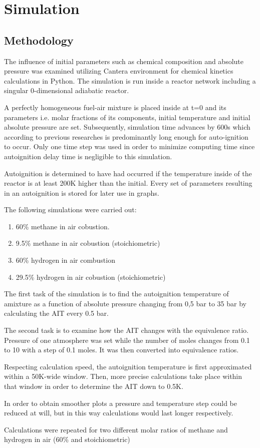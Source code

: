 \documentclass[a4paper,11pt]{article}
\begin{document}
       
    \section{Simulation}
    
    \subsection{Methodology}
    	The influence of initial parameters such as chemical composition and absolute pressure was examined utilizing Cantera environment for chemical kinetics calculations in Python. The simulation is run inside a reactor network including a singular 0-dimensional adiabatic reactor. \par 
        A perfectly homogeneous fuel-air mixture is placed inside at t=0 and its parameters i.e. molar fractions of its components, initial temperature and initial absolute pressure are set. Subsequently, simulation time advances by 600s which according to previous researches is predominantly long enough for auto-ignition to occur. Only one time step was used in order to minimize computing time since autoignition delay time is negligible to this simulation. \par 
        Autoignition is determined to have had occurred if the temperature inside of the reactor is at least 200K higher than the initial. Every set of parameters resulting in an autoignition is stored for later use in graphs. \par
        \newpage
        The following simulations were carried out:
\begin{enumerate}
  \item 60\% methane in air cobustion.
  \item 9.5\% methane in air cobustion (stoichiometric)
  \item 60\% hydrogen in air combustion
  \item 29.5\% hydrogen in air cobustion (stoichiometric)
\end{enumerate}
        The first task of the simulation is to find the autoignition temperature of amixture as a function of absolute pressure changing from 0,5 bar to 35 bar by calculating the AIT every 0.5 bar.\par
        The second task is to examine how the AIT changes with the equivalence ratio. Pressure of one atmosphere was set while the number of moles changes from 0.1 to 10 with a step of 0.1 moles. It was then  converted into equivalence ratios.\par 
        Respecting calculation speed, the autoignition temperature is first approximated within a 50K-wide window. Then, more precise calculations take place within that window in order to determine the AIT down to 0.5K.\par
        In order to obtain smoother plots a pressure and temperature step could be reduced at will, but in this way calculations would last longer respectively.\par
        Calculations were repeated for two different molar ratios of methane and hydrogen in air (60\% and stoichiometric)
     
\end{document}
